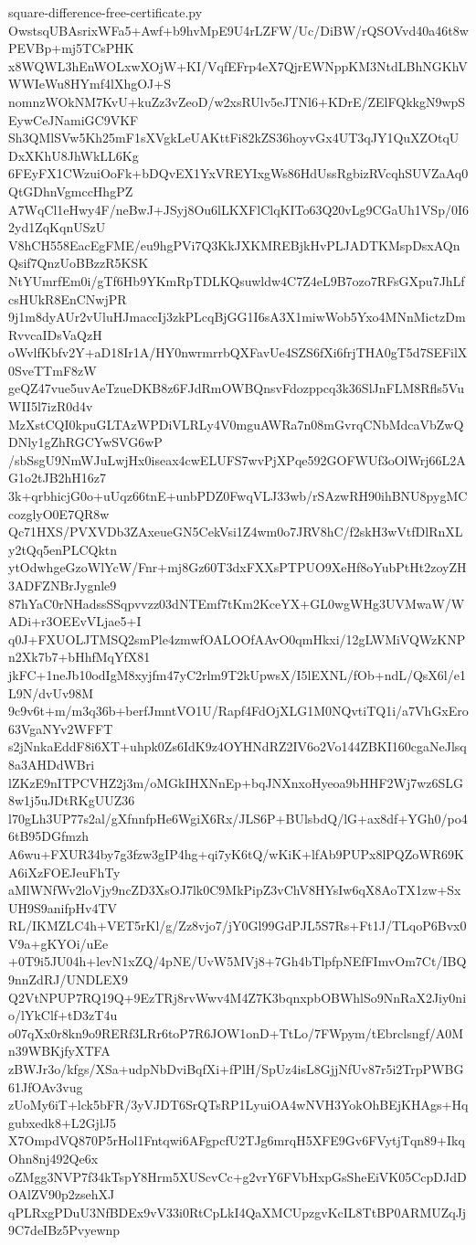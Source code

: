 \documentclass[11pt]{article}
\theoremstyle{definition}
\theoremstyle{remark}
\begin{document}
\begin{filecontents*}[overwrite]{square-difference-free-certificate.py}
OwstsqUBAsrixWFa5+Awf+b9hvMpE9U4rLZFW/Uc/DiBW/rQSOVvd40a46t8wPEVBp+mj5TCsPHK
x8WQWL3hEnWOLxwXOjW+KI/VqfEFrp4eX7QjrEWNppKM3NtdLBhNGKhVWWIeWu8HYmf4lXhgOJ+S
nomnzWOkNM7KvU+kuZz3vZeoD/w2xsRUlv5eJTNl6+KDrE/ZElFQkkgN9wpSEywCeJNamiGC9VKF
Sh3QMlSVw5Kh25mF1sXVgkLeUAKttFi82kZS36hoyvGx4UT3qJY1QuXZOtqUDxXKhU8JhWkLL6Kg
6FEyFX1CWzuiOoFk+bDQvEX1YxVREYIxgWs86HdUssRgbizRVcqhSUVZaAq0QtGDhnVgmccHhgPZ
A7WqCl1eHwy4F/neBwJ+JSyj8Ou6lLKXFlClqKITo63Q20vLg9CGaUh1VSp/0I62yd1ZqKqnUSzU
V8hCH558EacEgFME/eu9hgPVi7Q3KkJXKMREBjkHvPLJADTKMspDsxAQnQsif7QnzUoBBzzR5KSK
NtYUmrfEm0i/gTf6Hb9YKmRpTDLKQsuwldw4C7Z4eL9B7ozo7RFsGXpu7JhLfcsHUkR8EnCNwjPR
9j1m8dyAUr2vUluHJmaccIj3zkPLcqBjGG1I6sA3X1miwWob5Yxo4MNnMictzDmRvvcaIDsVaQzH
oWvlfKbfv2Y+aD18Ir1A/HY0nwrmrrbQXFavUe4SZS6fXi6frjTHA0gT5d7SEFilX0SveTTmF8zW
geQZ47vue5uvAeTzueDKB8z6FJdRmOWBQnsvFdozppcq3k36SlJnFLM8Rfls5VuWII5l7izR0d4v
MzXstCQI0kpuGLTAzWPDiVLRLy4V0mguAWRa7n08mGvrqCNbMdcaVbZwQDNly1gZhRGCYwSVG6wP
/sbSsgU9NmWJuLwjHx0iseax4cwELUFS7wvPjXPqe592GOFWUf3oOlWrj66L2AG1o2tJB2hH16z7
3k+qrbhicjG0o+uUqz66tnE+unbPDZ0FwqVLJ33wb/rSAzwRH90ihBNU8pygMCcozglyO0E7QR8w
Qc71HXS/PVXVDb3ZAxeueGN5CekVsi1Z4wm0o7JRV8hC/f2skH3wVtfDlRnXLy2tQq5enPLCQktn
ytOdwhgeGzoWlYcW/Fnr+mj8Gz60T3dxFXXsPTPUO9XeHf8oYubPtHt2zoyZH3ADFZNBrJygnle9
87hYaC0rNHadssSSqpvvzz03dNTEmf7tKm2KceYX+GL0wgWHg3UVMwaW/WADi+r3OEEvVLjae5+I
q0J+FXUOLJTMSQ2smPle4zmwfOALOOfAAvO0qmHkxi/12gLWMiVQWzKNPn2Xk7b7+bHhfMqYfX81
jkFC+1neJb10odIgM8xyjfm47yC2rlm9T2kUpwsX/I5lEXNL/fOb+ndL/QsX6l/e1L9N/dvUv98M
9c9v6t+m/m3q36b+berfJmntVO1U/Rapf4FdOjXLG1M0NQvtiTQ1i/a7VhGxEro63VgaNYv2WFFT
s2jNnkaEddF8i6XT+uhpk0Zs6IdK9z4OYHNdRZ2IV6o2Vo144ZBKI160cgaNeJlsq8a3AHDdWBri
lZKzE9nITPCVHZ2j3m/oMGkIHXNnEp+bqJNXnxoHyeoa9bHHF2Wj7wz6SLG8w1j5uJDtRKgUUZ36
l70gLh3UP77s2al/gXfnnfpHe6WgiX6Rx/JLS6P+BUlsbdQ/lG+ax8df+YGh0/po46tB95DGfmzh
A6wu+FXUR34by7g3fzw3gIP4hg+qi7yK6tQ/wKiK+lfAb9PUPx8lPQZoWR69KA6iXzFOEJeuFhTy
aMlWNfWv2loVjy9ncZD3XsOJ7lk0C9MkPipZ3vChV8HYsIw6qX8AoTX1zw+SxUH9S9anifpHv4TV
RL/IKMZLC4h+VET5rKl/g/Zz8vjo7/jY0Gl99GdPJL5S7Rs+Ft1J/TLqoP6Bvx0V9a+gKYOi/uEe
+0T9i5JU04h+levN1xZQ/4pNE/UvW5MVj8+7Gh4bTlpfpNEfFImvOm7Ct/IBQ9nnZdRJ/UNDLEX9
Q2VtNPUP7RQ19Q+9EzTRj8rvWwv4M4Z7K3bqnxpbOBWhlSo9NnRaX2Jiy0nio/lYkClf+tD3zT4u
o07qXx0r8kn9o9RERf3LRr6toP7R6JOW1onD+TtLo/7FWpym/tEbrclsngf/A0Mn39WBKjfyXTFA
zBWJr3o/kfgs/XSa+udpNbDviBqfXi+fPlH/SpUz4isL8GjjNfUv87r5i2TrpPWBG61JfOAv3vug
zUoMy6iT+lck5bFR/3yVJDT6SrQTsRP1LyuiOA4wNVH3YokOhBEjKHAgs+Hqgubxedk8+L2GjlJ5
X7OmpdVQ870P5rHol1Fntqwi6AFgpcfU2TJg6mrqH5XFE9Gv6FVytjTqn89+IkqOhn8nj492Qe6x
oZMgg3NVP7f34kTspY8Hrm5XUScvCc+g2vrY6FVbHxpGsSheEiVK05CcpDJdDOAlZV90p2zsehXJ
qPLRxgPDuU3NfBDEx9vV33i0RtCpLkI4QaXMCUpzgvKcIL8TtBP0ARMUZqJj9C7deIBz5Pvyewnp

\end{filecontents*}
\end{document}
